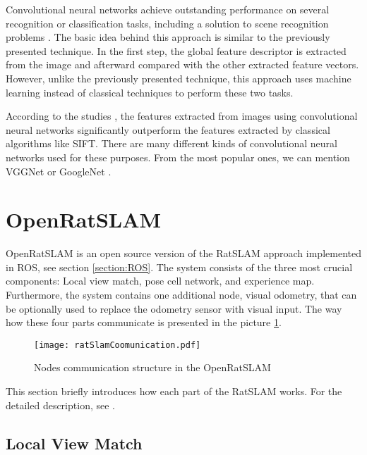 Convolutional neural networks achieve outstanding performance on several recognition or classification tasks, including a solution to scene recognition problems \parencite{CNNSceneRecognition1} \parencite{CNNSceneRecognition2}. The basic idea behind this approach is similar to the previously presented technique. In the first step, the global feature descriptor is extracted from the image and afterward compared with the other extracted feature vectors. However, unlike the previously presented technique, this approach uses machine learning instead of classical techniques to perform these two tasks.\par
According to the studies \cite{fischer2014descriptor}\cite{Imagenet}, the features extracted from images using convolutional neural networks significantly outperform the features extracted by classical algorithms like SIFT. There are many different kinds of convolutional neural networks used for these purposes. From the most popular ones, we can mention VGGNet \parencite{VggNet} or GoogleNet \parencite{GoogleNet}.

\section{OpenRatSLAM}\label{section:ratSlamRW}

OpenRatSLAM is an open source version of the RatSLAM approach implemented in ROS, see section \ref{section:ROS}. The system consists of the three most crucial components: Local view match, pose cell network, and experience map. Furthermore, the system contains one additional node, visual odometry, that can be optionally used to replace the odometry sensor with visual input. The way how these four parts communicate is presented in the picture \ref{fig:ratSlamCommunication}.\par

\begin{figure}[htpb]
    \centering
    \texttt{[image: ratSlamCoomunication.pdf]}
    \caption{Nodes communication structure in the OpenRatSLAM} \label{fig:ratSlamCommunication}
\end{figure}

This section briefly introduces how each part of the RatSLAM works. For the detailed description, see \cite{RatSLAM} \cite{OpenRatSLAM}.

\subsection{Local View Match}\label{section:lvMatchROS}

